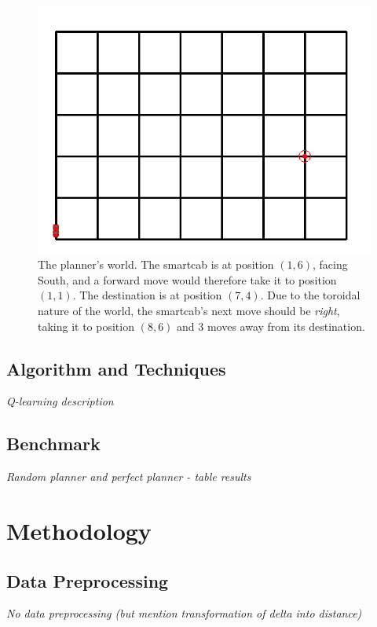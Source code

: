 \documentclass{article}
\begin{document}
\begin{figure}
\includegraphics[width=\textwidth]{planner_world}
\centering
\caption{The planner's world. The smartcab is at position $(1, 6)$, facing South, and a forward move would therefore take it to position $(1, 1)$. The destination is at position $(7, 4)$. Due to the toroidal nature of the world, the smartcab's next move should be \textit{right}, taking it to position $(8, 6)$ and 3 moves away from its destination.}
\end{figure}

\subsection{Algorithm and Techniques}
\label{sec:algos}
\textit{Q-learning description}

\subsection{Benchmark}
\label{sec:benchmark}
\textit{Random planner and perfect planner - table results}


\section{Methodology}

\subsection{Data Preprocessing}
\textit{No data preprocessing (but mention transformation of delta into distance)}
\end{document}

